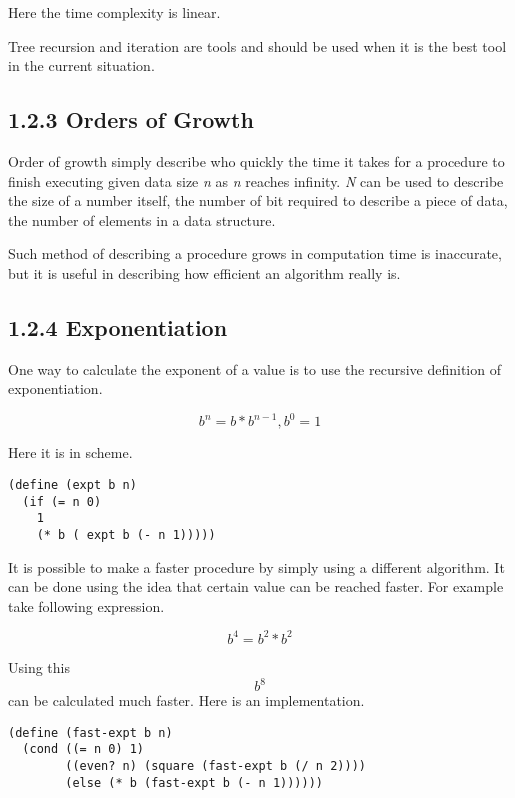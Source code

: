 \documentclass[11pt]{article}
\begin{document}
Here the time complexity is linear.

Tree recursion and iteration are tools and should be used when it is the
best tool in the current situation.

\subsection{1.2.3 Orders of Growth}
\label{sec:orgcd36e3d}
Order of growth simply describe who quickly the time it takes for a
procedure to finish executing given data size \emph{n} as \emph{n} reaches
infinity. \emph{N} can be used to describe the size of a number itself, the
number of bit required to describe a piece of data, the number of
elements in a data structure.

Such method of describing a procedure grows in computation time is
inaccurate, but it is useful in describing how efficient an algorithm
really is.

\subsection{1.2.4 Exponentiation}
\label{sec:orga58f381}
One way to calculate the exponent of a value is to use the recursive
definition of exponentiation.

\begin{equation}
b^n = b * b^{n-1},
b^0 = 1
\end{equation}

Here it is in scheme.

\begin{verbatim}
(define (expt b n)
  (if (= n 0)
    1
    (* b ( expt b (- n 1)))))
\end{verbatim}

It is possible to make a faster procedure by simply using a different
algorithm. It can be done using the idea that certain value can be
reached faster. For example take following expression.

\begin{equation}
b^4 = b^2 * b^2
\end{equation}

Using this \[ b^8 \] can be calculated much faster. Here is an
implementation.

\begin{verbatim}
(define (fast-expt b n)
  (cond ((= n 0) 1)
        ((even? n) (square (fast-expt b (/ n 2))))
        (else (* b (fast-expt b (- n 1))))))
\end{verbatim}
\end{document}
